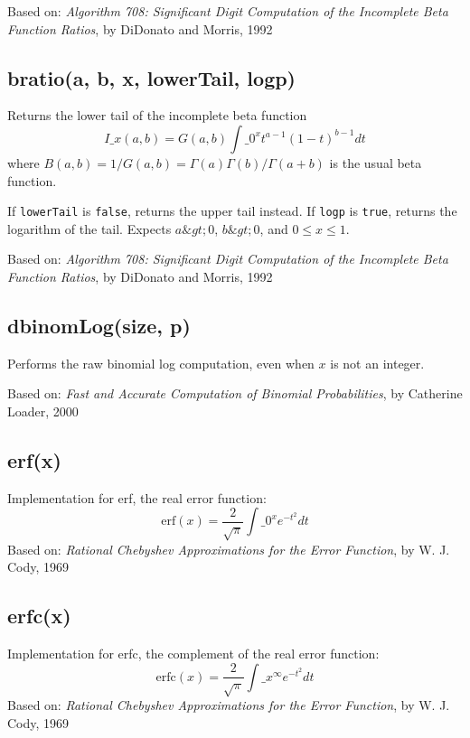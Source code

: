 \documentclass{article}
\begin{document}
Based on: \emph{Algorithm 708: Significant Digit Computation of the Incomplete Beta Function
Ratios}, by DiDonato and Morris, 1992


    \subsection*{bratio(a, b, x, lowerTail, logp)}
    Returns the lower tail of the incomplete beta function
$$I\_x(a, b)=G(a,b)\int\_0^xt^{a-1}(1-t)^{b-1}dt$$
where $B(a,b)=1/G(a,b) = \Gamma(a)\Gamma(b)/\Gamma(a+b)$ is the
usual beta function.


If \texttt{lowerTail} is \texttt{false}, returns the upper tail instead.
If \texttt{logp} is \texttt{true}, returns the logarithm of the tail.
Expects $a\&gt;0$, $b\&gt;0$, and $0 \leq x \leq 1$.


Based on: \emph{Algorithm 708: Significant Digit Computation of the Incomplete Beta Function
Ratios}, by DiDonato and Morris, 1992


    \subsection*{dbinomLog(size, p)}
    Performs the raw binomial log computation, even when $x$ is not an
integer.


Based on:  \emph{Fast and Accurate Computation of Binomial Probabilities},
by Catherine Loader, 2000


    \subsection*{erf(x)}
    Implementation for erf, the real error function:
$$\textrm{erf}(x) = \frac{2}{\sqrt{\pi}}\int\_0^x e^{-t^2} dt$$
Based on: \emph{Rational Chebyshev Approximations for the Error
Function}, by W. J. Cody, 1969


    \subsection*{erfc(x)}
    Implementation for erfc, the complement of the real error function:
$$\textrm{erfc}(x) = \frac{2}{\sqrt{\pi}}\int\_x^\infty e^{-t^2} dt$$
Based on: \emph{Rational Chebyshev Approximations for the Error
Function}, by W. J. Cody, 1969
\end{document}
